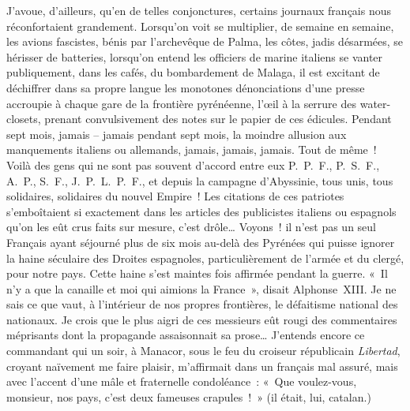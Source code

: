 \documentclass[french,twoside]{book} %
\begin{document}
J’avoue, d’ailleurs, qu’en de telles conjonctures, certains journaux français nous réconfortaient grandement. Lorsqu’on voit se multiplier, de semaine en semaine, les avions fascistes, bénis par l’archevêque de Palma, les côtes, jadis désarmées, se hérisser de batteries, lorsqu’on entend les officiers de marine italiens se vanter publiquement, dans les cafés, du bombardement de Malaga, il est excitant de déchiffrer dans sa propre langue les monotones dénonciations d’une presse accroupie à chaque gare de la frontière pyrénéenne, l’œil à la serrure des water-closets, prenant convulsivement des notes sur le papier de ces édicules. Pendant sept mois, jamais – jamais pendant sept mois, la moindre allusion aux manquements italiens ou allemands, jamais, jamais, jamais. Tout de même ! Voilà des gens qui ne sont pas souvent d’accord entre eux P. P. F., P. S. F., A. P., S. F., J. P. L. P. F., et depuis la campagne d’Abyssinie, tous unis, tous solidaires, solidaires du nouvel Empire ! Les citations de ces patriotes s’emboîtaient si exactement dans les articles des publicistes italiens ou espagnols qu’on les eût crus faits sur mesure, c’est drôle… Voyons ! il n’est pas un seul Français ayant séjourné plus de six mois au-delà des Pyrénées qui puisse ignorer la haine séculaire des Droites espagnoles, particulièrement de l’armée et du clergé, pour notre pays. Cette haine s’est maintes fois affirmée pendant la guerre. « Il n’y a que la canaille et moi qui aimions la France », disait Alphonse \textsc{XIII}. Je ne sais ce que vaut, à l’intérieur de nos propres frontières, le défaitisme national des nationaux. Je crois que le plus aigri de ces messieurs eût rougi des commentaires méprisants dont la propagande assaisonnait sa prose… J’entends encore ce commandant qui un soir, à Manacor, sous le feu du croiseur républicain \emph{Libertad}, croyant naïvement me faire plaisir, m’affirmait dans un français mal assuré, mais avec l’accent d’une mâle et fraternelle condoléance : « Que voulez-vous, monsieur, nos pays, c’est deux fameuses crapules ! » (il était, lui, catalan.)\par
\end{document}
